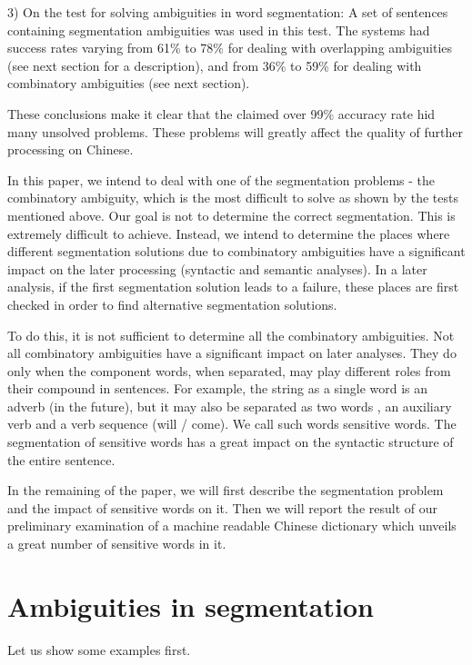 3) On the test for solving ambiguities in word segmentation:
A set of sentences containing segmentation ambiguities was used in this test. The systems had success rates varying 
from 61\% to 78\% for dealing with overlapping ambiguities (see next section for a description), and from 36\% to 
59\% for dealing with combinatory ambiguities (see next section).

These conclusions make it clear that the claimed over 99\% accuracy rate hid many unsolved problems. These problems 
will greatly affect the quality of further processing on Chinese.

In this paper, we intend to deal with one of the segmentation problems - the combinatory ambiguity, which is the most 
difficult to solve as shown by the tests mentioned above. Our goal is not to determine the correct segmentation. This is 
extremely difficult to achieve. Instead, we intend to determine the places where different segmentation solutions due to 
combinatory ambiguities have a significant impact on the later processing (syntactic and semantic analyses). In a later 
analysis, if the first segmentation solution leads to a failure, these places are first checked in order to find alternative 
segmentation solutions.

To do this, it is not sufficient to determine all the combinatory ambiguities. Not all combinatory ambiguities have a 
significant impact on later analyses. They do only when the component words, when separated, may play different roles 
from their compound in sentences. For example, the string  as a single word is an adverb (in the future), but it may 
also be separated as two words , an auxiliary verb and a verb sequence (will / come). We call such words 
sensitive words.  The segmentation of sensitive words has a great impact on the syntactic structure of the entire 
sentence. 

In the remaining of the paper, we will first describe the segmentation problem and the impact of sensitive words on it. 
Then we will report the result of our preliminary examination of a machine readable Chinese dictionary which unveils a 
great number of sensitive words in it. 

\vspace{2mm}
\section{Ambiguities in segmentation}

Let us show some examples first.

